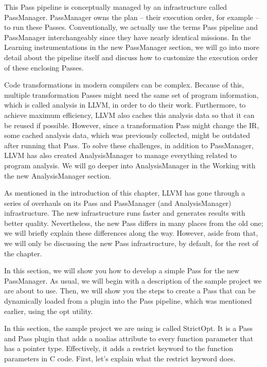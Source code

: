 This Pass pipeline is conceptually managed by an infrastructure called PassManager. PassManager owns the plan – their execution order, for example – to run these Passes. Conventionally, we actually use the terms Pass pipeline and PassManager interchangeably since they have nearly identical missions. In the Learning instrumentations in the new PassManager section, we will go into more detail about the pipeline itself and discuss how to customize the execution order of these enclosing Passes.

Code transformations in modern compilers can be complex. Because of this, multiple transformation Passes might need the same set of program information, which is called analysis in LLVM, in order to do their work. Furthermore, to achieve maximum efficiency, LLVM also caches this analysis data so that it can be reused if possible. However, since a transformation Pass might change the IR, some cached analysis data, which was previously collected, might be outdated after running that Pass. To solve these challenges, in addition to PassManager, LLVM has also created AnalysisManager to manage everything related to program analysis. We will go deeper into AnalysisManager in the Working with the new AnalysisManager section.

As mentioned in the introduction of this chapter, LLVM has gone through a series of overhauls on its Pass and PassManager (and AnalysisManager) infrastructure. The new infrastructure runs faster and generates results with better quality. Nevertheless, the new Pass differs in many places from the old one; we will briefly explain these differences along the way. However, aside from that, we will only be discussing the new Pass infrastructure, by default, for the rest of the chapter.

In this section, we will show you how to develop a simple Pass for the new PassManager. As usual, we will begin with a description of the sample project we are about to use. Then, we will show you the steps to create a Pass that can be dynamically loaded from a plugin into the Pass pipeline, which was mentioned earlier, using the opt utility.



In this section, the sample project we are using is called StrictOpt. It is a Pass and Pass plugin that adds a noalias attribute to every function parameter that has a pointer type. Effectively, it adds a restrict keyword to the function parameters in C code. First, let's explain what the restrict keyword does.

